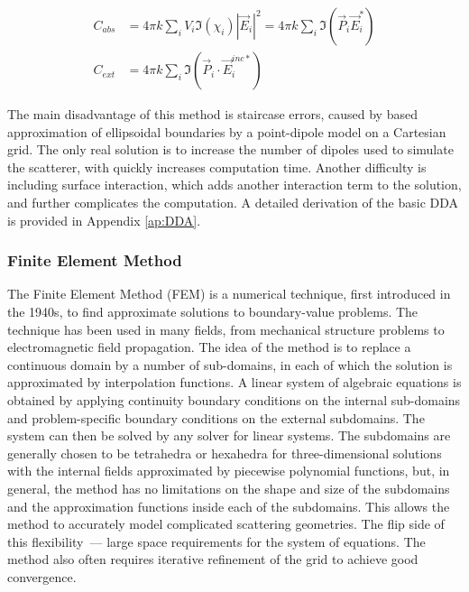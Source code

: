             \begin{align}
                C_{abs} &= 4\pi k \sum_i V_i \Im(\chi_i)|\vec{E}_i|^2 = 4\pi k \sum_i \Im(\vec{P}_i\vec{E}_i^*) \\
                C_{ext} &= 4\pi k \sum_i \Im (\vec{P}_i\cdot\vec{E}_i^{inc*})
            \end{align}

                The main disadvantage of this method is staircase errors, caused by based approximation of ellipsoidal boundaries by a point-dipole
            model on a Cartesian grid. The only real solution is to increase the number of dipoles used to simulate the scatterer, with quickly increases
            computation time. Another difficulty is including surface interaction, which adds another interaction term to the solution, and further
            complicates the computation. A detailed derivation of the basic DDA is provided in Appendix \ref{ap:DDA}.

        \subsubsection{Finite Element Method}
                The Finite Element Method (FEM) is a numerical technique, first introduced in the 1940s\cite{courant1994variational}, to
            find approximate solutions to boundary-value problems. The technique has been used in many fields, from mechanical structure
            problems to electromagnetic field propagation.
                The idea of the method is to replace a continuous domain by a number of sub-domains, in each of which the solution is
            approximated by interpolation functions. A linear system of algebraic equations is obtained by applying continuity boundary conditions
            on the internal sub-domains and problem-specific boundary conditions on the external subdomains. The system can then be solved
            by any solver for linear systems. The subdomains are generally chosen to be tetrahedra or hexahedra for three-dimensional solutions
            with the internal fields approximated by piecewise polynomial functions, but, in general, the method has no limitations on the
            shape and size of the subdomains and the approximation functions inside each of the subdomains. This allows the method
            to accurately model complicated scattering geometries. The flip side of this flexibility~--- large space requirements for
            the system of equations. The method also often requires iterative refinement of the grid to achieve good convergence.


